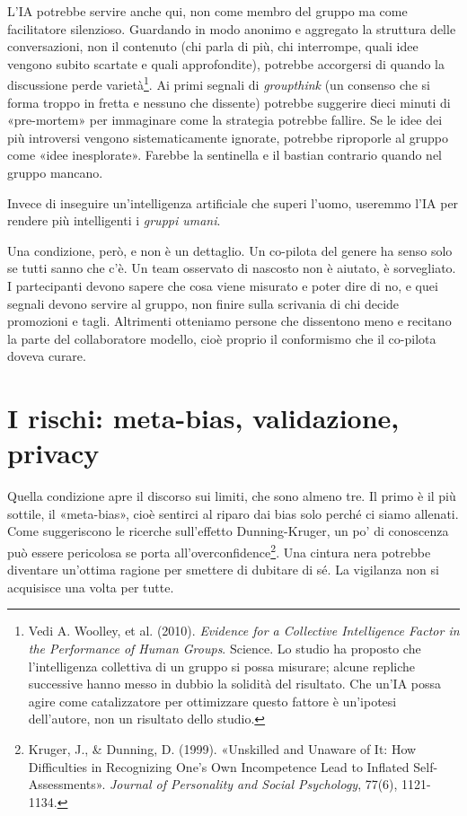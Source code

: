 L'IA potrebbe servire anche qui, non come membro del gruppo ma come facilitatore silenzioso. Guardando in modo anonimo e aggregato la struttura delle conversazioni, non il contenuto (chi parla di più, chi interrompe, quali idee vengono subito scartate e quali approfondite), potrebbe accorgersi di quando la discussione perde varietà\footnote{Vedi A. Woolley, et al. (2010). \textit{Evidence for a Collective Intelligence Factor in the Performance of Human Groups}. Science. Lo studio ha proposto che l'intelligenza collettiva di un gruppo si possa misurare; alcune repliche successive hanno messo in dubbio la solidità del risultato. Che un'IA possa agire come catalizzatore per ottimizzare questo fattore è un'ipotesi dell'autore, non un risultato dello studio.}. Ai primi segnali di \textit{groupthink} (un consenso che si forma troppo in fretta e nessuno che dissente) potrebbe suggerire dieci minuti di «pre-mortem» per immaginare come la strategia potrebbe fallire. Se le idee dei più introversi vengono sistematicamente ignorate, potrebbe riproporle al gruppo come «idee inesplorate». Farebbe la sentinella e il bastian contrario quando nel gruppo mancano.

Invece di inseguire un'intelligenza artificiale che superi l'uomo, useremmo l'IA per rendere più intelligenti i \textit{gruppi umani}.

Una condizione, però, e non è un dettaglio. Un co-pilota del genere ha senso solo se tutti sanno che c'è. Un team osservato di nascosto non è aiutato, è sorvegliato. I partecipanti devono sapere che cosa viene misurato e poter dire di no, e quei segnali devono servire al gruppo, non finire sulla scrivania di chi decide promozioni e tagli. Altrimenti otteniamo persone che dissentono meno e recitano la parte del collaboratore modello, cioè proprio il conformismo che il co-pilota doveva curare.

\section{I rischi: meta-bias, validazione, privacy}
\label{sec:p4c33-meta-bias-validazione}
Quella condizione apre il discorso sui limiti, che sono almeno tre. Il primo è il più sottile, il «meta-bias», cioè sentirci al riparo dai bias solo perché ci siamo allenati. Come suggeriscono le ricerche sull'effetto Dunning-Kruger, un po' di conoscenza può essere pericolosa se porta all'overconfidence\footnote{Kruger, J., \& Dunning, D. (1999). «Unskilled and Unaware of It: How Difficulties in Recognizing One's Own Incompetence Lead to Inflated Self-Assessments». \textit{Journal of Personality and Social Psychology}, 77(6), 1121-1134.}. Una cintura nera potrebbe diventare un'ottima ragione per smettere di dubitare di sé. La vigilanza non si acquisisce una volta per tutte.

